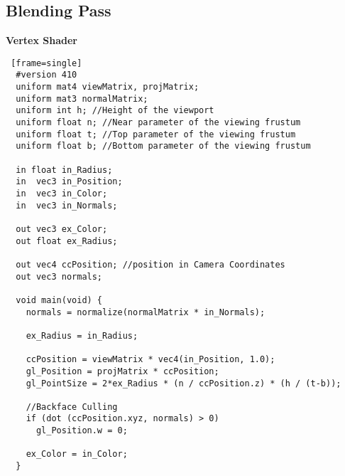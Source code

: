 \subsection{Blending Pass}
\textbf{Vertex Shader}
\begin{lstlisting} [frame=single]
  #version 410
  uniform mat4 viewMatrix, projMatrix;
  uniform mat3 normalMatrix;
  uniform int h; //Height of the viewport
  uniform float n; //Near parameter of the viewing frustum
  uniform float t; //Top parameter of the viewing frustum
  uniform float b; //Bottom parameter of the viewing frustum

  in float in_Radius;
  in  vec3 in_Position;
  in  vec3 in_Color;
  in  vec3 in_Normals;

  out vec3 ex_Color;
  out float ex_Radius;

  out vec4 ccPosition; //position in Camera Coordinates
  out vec3 normals;

  void main(void) {
    normals = normalize(normalMatrix * in_Normals);

    ex_Radius = in_Radius;

    ccPosition = viewMatrix * vec4(in_Position, 1.0);
    gl_Position = projMatrix * ccPosition;
    gl_PointSize = 2*ex_Radius * (n / ccPosition.z) * (h / (t-b));

    //Backface Culling
    if (dot (ccPosition.xyz, normals) > 0)
      gl_Position.w = 0;

    ex_Color = in_Color;
  }
\end{lstlisting}
\newpage

